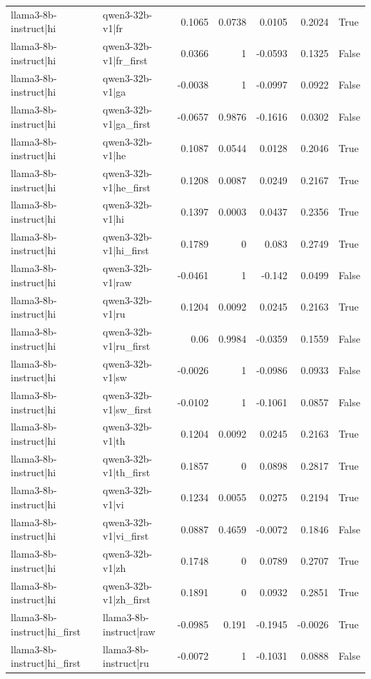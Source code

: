 \begin{table}
\begin{tabular}{l l r r r r l}
llama3-8b-instruct|hi & qwen3-32b-v1|fr & 0.1065 & 0.0738 & 0.0105 & 0.2024 & True \\
llama3-8b-instruct|hi & qwen3-32b-v1|fr_first & 0.0366 & 1 & -0.0593 & 0.1325 & False \\
llama3-8b-instruct|hi & qwen3-32b-v1|ga & -0.0038 & 1 & -0.0997 & 0.0922 & False \\
llama3-8b-instruct|hi & qwen3-32b-v1|ga_first & -0.0657 & 0.9876 & -0.1616 & 0.0302 & False \\
llama3-8b-instruct|hi & qwen3-32b-v1|he & 0.1087 & 0.0544 & 0.0128 & 0.2046 & True \\
llama3-8b-instruct|hi & qwen3-32b-v1|he_first & 0.1208 & 0.0087 & 0.0249 & 0.2167 & True \\
llama3-8b-instruct|hi & qwen3-32b-v1|hi & 0.1397 & 0.0003 & 0.0437 & 0.2356 & True \\
llama3-8b-instruct|hi & qwen3-32b-v1|hi_first & 0.1789 & 0 & 0.083 & 0.2749 & True \\
llama3-8b-instruct|hi & qwen3-32b-v1|raw & -0.0461 & 1 & -0.142 & 0.0499 & False \\
llama3-8b-instruct|hi & qwen3-32b-v1|ru & 0.1204 & 0.0092 & 0.0245 & 0.2163 & True \\
llama3-8b-instruct|hi & qwen3-32b-v1|ru_first & 0.06 & 0.9984 & -0.0359 & 0.1559 & False \\
llama3-8b-instruct|hi & qwen3-32b-v1|sw & -0.0026 & 1 & -0.0986 & 0.0933 & False \\
llama3-8b-instruct|hi & qwen3-32b-v1|sw_first & -0.0102 & 1 & -0.1061 & 0.0857 & False \\
llama3-8b-instruct|hi & qwen3-32b-v1|th & 0.1204 & 0.0092 & 0.0245 & 0.2163 & True \\
llama3-8b-instruct|hi & qwen3-32b-v1|th_first & 0.1857 & 0 & 0.0898 & 0.2817 & True \\
llama3-8b-instruct|hi & qwen3-32b-v1|vi & 0.1234 & 0.0055 & 0.0275 & 0.2194 & True \\
llama3-8b-instruct|hi & qwen3-32b-v1|vi_first & 0.0887 & 0.4659 & -0.0072 & 0.1846 & False \\
llama3-8b-instruct|hi & qwen3-32b-v1|zh & 0.1748 & 0 & 0.0789 & 0.2707 & True \\
llama3-8b-instruct|hi & qwen3-32b-v1|zh_first & 0.1891 & 0 & 0.0932 & 0.2851 & True \\
llama3-8b-instruct|hi_first & llama3-8b-instruct|raw & -0.0985 & 0.191 & -0.1945 & -0.0026 & True \\
llama3-8b-instruct|hi_first & llama3-8b-instruct|ru & -0.0072 & 1 & -0.1031 & 0.0888 & False \\

\end{tabular}
\end{table}
